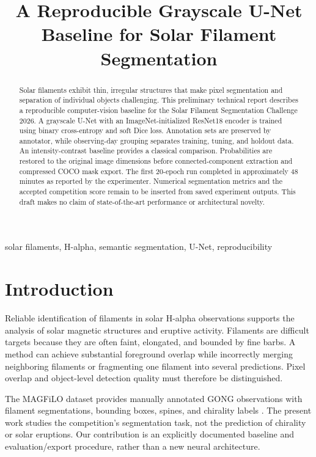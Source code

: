 \documentclass[conference]{IEEEtran}
\title{A Reproducible Grayscale U-Net Baseline for Solar Filament Segmentation}
\author{\IEEEauthorblockN{Author name to be confirmed}
\IEEEauthorblockA{Affiliation and contact to be supplied}}
\begin{document}
\maketitle
\begin{abstract}
Solar filaments exhibit thin, irregular structures that make pixel segmentation
and separation of individual objects challenging. This preliminary technical
report describes a reproducible computer-vision baseline for the Solar Filament
Segmentation Challenge 2026. A grayscale U-Net with an ImageNet-initialized
ResNet18 encoder is trained using binary cross-entropy and soft Dice loss.
Annotation sets are preserved by annotator, while observing-day grouping
separates training, tuning, and holdout data. An intensity-contrast baseline
provides a classical comparison. Probabilities are restored to the original
image dimensions before connected-component extraction and compressed COCO
mask export. The first 20-epoch run completed in approximately 48 minutes as
reported by the experimenter. Numerical segmentation metrics and the accepted
competition score remain to be inserted from saved experiment outputs.
This draft makes no claim of state-of-the-art performance or architectural novelty.
\end{abstract}
\begin{IEEEkeywords}
solar filaments, H-alpha, semantic segmentation, U-Net, reproducibility
\end{IEEEkeywords}

\section{Introduction}
Reliable identification of filaments in solar H-alpha observations supports
the analysis of solar magnetic structures and eruptive activity.
Filaments are difficult targets because they are often faint, elongated,
and bounded by fine barbs. A method can achieve substantial foreground overlap
while incorrectly merging neighboring filaments or fragmenting one filament
into several predictions. Pixel overlap and object-level detection quality
must therefore be distinguished.

The MAGFiLO dataset provides manually annotated GONG observations with
filament segmentations, bounding boxes, spines, and chirality labels
\cite{magfilo}. The present work studies the competition's segmentation task,
not the prediction of chirality or solar eruptions. Our contribution is an
explicitly documented baseline and evaluation/export procedure, rather than a
new neural architecture.
\end{document}
